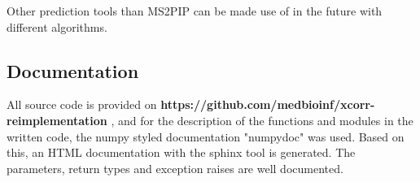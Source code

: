 \documentclass[11pt]{article}
\begin{document}
Other prediction tools than MS2PIP can be made use of in the future with different algorithms.

\subsection{Documentation}
All source code is provided on \textbf{https://github.com/medbioinf/xcorr-reimplementation} , and for the description of the functions and modules in the written code, the numpy styled documentation "numpydoc" was used. Based on this, an HTML documentation with the sphinx tool is generated. The parameters, return types and exception raises are well documented.

\newpage

\printbibliography
\end{document}
